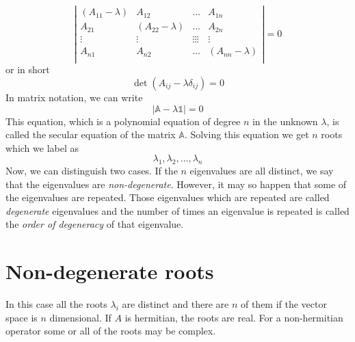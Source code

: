 \begin{equation}
	\left|
	\begin{matrix}
		(A_{11}-\lambda) & A_{12} & \ldots & A_{1n} \\
		A_{21} & (A_{22}-\lambda) & \ldots & A_{2n} \\
		\vdots & \vdots & \vdots \vdots \vdots & \vdots \\
		A_{n1} & A_{n2} & \ldots & (A_{nn}-\lambda) \\
	\end{matrix}
	\right| = 0
\end{equation}
	or in short
	\begin{equation}
		\det(A_{ij} - \lambda \delta_{ij}) = 0
	\end{equation}
	In matrix notation, we can write
	\begin{equation}
		\left|\mathbb{A} - \lambda \mathbb{1} \right| = 0
	\end{equation}
	This equation, which is a polynomial equation of degree $n$ in the unknown $\lambda$, is called the secular equation of the matrix $\mathbb{A}$. Solving this equation we get $n$ roots which we label as 
	\begin{equation}
		\lambda_1, \lambda_2, \ldots, \lambda_n \nonumber
	\end{equation}
	Now, we can distinguish two cases. If the $n$ eigenvalues are all distinct, we say that the eigenvalues are \textit{non-degenerate}. However, it may so happen that some of the eigenvalues are repeated. Those eigenvalues which are repeated are called \textit{degenerate}
	eigenvalues and the number of times an eigenvalue is repeated is called the \textit{order of degeneracy} of that eigenvalue.
	
	\section{Non-degenerate roots}
	In this case all the roots $\lambda_i$ are distinct and there are $n$ of them if the vector space is $n$ dimensional. If $A$ is hermitian, the roots are real. For a non-hermitian operator some or all of the roots may be complex.\\
	
